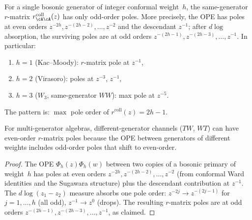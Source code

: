 \begin{proposition}
\label{prop:bosonic-parity-constraint}
For a single bosonic generator of integer conformal weight~$h$,
the same-generator $r$-matrix
$r^{\mathrm{coll}}_{\cA\cA}(z)$
has only odd-order poles.
More precisely, the OPE has poles at even orders
$z^{-2h}, z^{-(2h-2)}, \ldots, z^{-2}$ and the descendant
$z^{-1}$; after $d\log$ absorption, the surviving poles are at
odd orders $z^{-(2h-1)}, z^{-(2h-3)}, \ldots, z^{-1}$.
In particular:
\begin{enumerate}[label=\textup{(\roman*)}]
\item $h = 1$ \textup{(}Kac--Moody\textup{)}: $r$-matrix pole at $z^{-1}$,
\item $h = 2$ \textup{(}Virasoro\textup{)}: poles at $z^{-3}$, $z^{-1}$,
\item $h = 3$ \textup{(}$W_3$, same-generator $WW$\textup{)}: max pole at $z^{-5}$.
\end{enumerate}
The pattern is: $\max$ pole order of $r^{\mathrm{coll}}(z) = 2h - 1$.

For multi-generator algebras, different-generator channels
\textup{(}$TW$, $WT$\textup{)} can have even-order $r$-matrix
poles because the OPE between generators of different weights
includes odd-order poles that shift to even-order.
\end{proposition}

\begin{proof}
The OPE $\Phi_h(z)\Phi_h(w)$ between two copies of a bosonic
primary of weight~$h$ has poles at even orders
$z^{-2h}, z^{-(2h-2)}, \ldots, z^{-2}$
(from conformal Ward identities and the Sugawara structure)
plus the descendant contribution at $z^{-1}$.
The $d\log(z_1 - z_2)$ measure absorbs one pole order:
$z^{-2j} \to z^{-(2j-1)}$ for $j = 1, \ldots, h$ (all odd),
$z^{-1} \to z^0$ (drops).
The resulting $r$-matrix poles are at odd orders
$z^{-(2h-1)}, z^{-(2h-3)}, \ldots, z^{-1}$, as claimed.
\end{proof}

